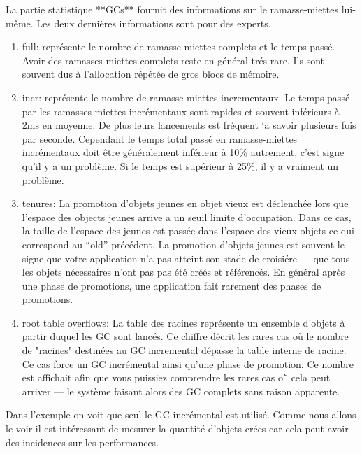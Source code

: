 \documentclass[a4paper,10pt,twoside]{book}
\begin{document}
La partie statistique **GCs** fournit des informations sur le
ramasse-miettes lui-m\^eme. Les deux derni\`eres informations sont
pour des experts. 

\begin{enumerate}
\item full: repr\'esente le nombre de ramasse-miettes complets et le
  temps pass\'e. Avoir des ramasses-miettes complets reste en
  g\'en\'eral tr\'es rare. Ils sont souvent dus \`a l'allocation
  r\'ep\'et\'ee de gros blocs de m\'emoire. 

\item incr: repr\'esente le nombre de ramasse-miettes incrementaux. Le
  temps pass\'e par les ramasses-miettes incr\'ementaux sont rapides
  et souvent inf\'erieurs \`a 2ms en moyenne. De plus leurs lancements
  est fr\'equent `a savoir plusieurs fois par seconde. Cependant 
le temps total pass\'e en ramasse-miettes incr\'ementaux doit \^etre g\'en\'eralement inf\'erieur \`a 10\% autrement, c'est signe qu'il y a un probl\`eme. Si le temps est sup\'erieur \`a 25\%, il y a vraiment un probl\`eme.

\item tenures: La promotion d'objets jeunes en objet vieux est
  d\'eclench\'ee lors que l'espace des objects jeunes arrive a un
  seuil limite d'occupation. Dans ce cas, la taille de l'espace des
  jeunes est pass\'ee dans l'espace des vieux objets ce qui correspond
  au ``old'' pr\'ec\'edent. La promotion d'objets jeunes  est souvent
  le signe que votre application n'a pas atteint son stade de
  croisi\'ere --- que tous les objets n\'ecessaires n'ont pas pas
  \'et\'e cr\'e\'es et r\'ef\'erenc\'es. En g\'en\'eral apr\`es une
  phase de promotions, une application fait rarement des phases de
  promotions. 

\item root table overflows: La table des racines repr\'esente un
  ensemble d'objets \`a partir duquel les GC sont lanc\'es. Ce chiffre
  d\'ecrit les rares cas o\`u le nombre de "racines" destin\'ees au
GC incremental d\'epasse la table interne de racine. Ce cas force un
GC incr\'emental ainsi qu'une phase de promotion. Ce nombre est
affichait afin que vous puissiez comprendre les rares cas o\u` cela
peut arriver --- le syst\`eme faisant alors des GC complets sans
raison apparente. 
\end{enumerate}


Dans l'exemple on voit que seul le GC incr\'emental est utilis\'e. 
Comme nous allons le voir il est int\'eressant de mesurer la
quantit\'e d'objets cr\'ees car cela peut avoir des incidences sur les
performances.
\end{document}
